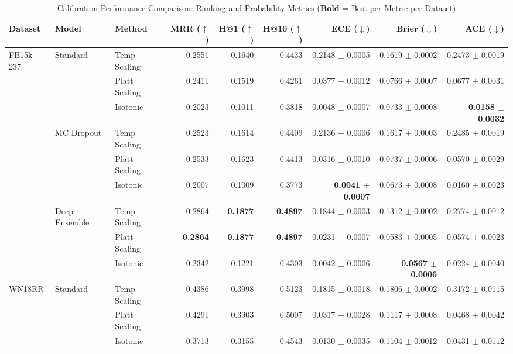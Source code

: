 \begin{table}[t]
\centering
\small
\caption{Calibration Performance Comparison: Ranking and Probability Metrics (\textbf{Bold} = Best per Metric per Dataset)}
\label{tab:calibration_comparison}
\begin{tabular}{ll l rrrrrr}
\toprule
\textbf{Dataset} & \textbf{Model} & \textbf{Method} & MRR ($\uparrow$) & H@1 ($\uparrow$) & H@10 ($\uparrow$) & ECE ($\downarrow$) & Brier ($\downarrow$) & ACE ($\downarrow$) \\
\midrule
\multirow{9}{*}{FB15k-237} & \multirow{3}{*}{Standard} & Temp Scaling & 0.2551 & 0.1640 & 0.4433 & 0.2148 $\pm$ 0.0005 & 0.1619 $\pm$ 0.0002 & 0.2473 $\pm$ 0.0019 \\
 &  & Platt Scaling & 0.2411 & 0.1519 & 0.4261 & 0.0377 $\pm$ 0.0012 & 0.0766 $\pm$ 0.0007 & 0.0677 $\pm$ 0.0031 \\
 &  & Isotonic & 0.2023 & 0.1011 & 0.3818 & 0.0048 $\pm$ 0.0007 & 0.0733 $\pm$ 0.0008 & \textbf{0.0158 $\pm$ 0.0032} \\
\cmidrule(lr){2-9}
 & \multirow{3}{*}{MC Dropout} & Temp Scaling & 0.2523 & 0.1614 & 0.4409 & 0.2136 $\pm$ 0.0006 & 0.1617 $\pm$ 0.0003 & 0.2485 $\pm$ 0.0019 \\
 &  & Platt Scaling & 0.2533 & 0.1623 & 0.4413 & 0.0316 $\pm$ 0.0010 & 0.0737 $\pm$ 0.0006 & 0.0570 $\pm$ 0.0029 \\
 &  & Isotonic & 0.2007 & 0.1009 & 0.3773 & \textbf{0.0041 $\pm$ 0.0007} & 0.0673 $\pm$ 0.0008 & 0.0160 $\pm$ 0.0023 \\
\cmidrule(lr){2-9}
 & \multirow{3}{*}{Deep Ensemble} & Temp Scaling & 0.2864 & \textbf{0.1877} & \textbf{0.4897} & 0.1844 $\pm$ 0.0003 & 0.1312 $\pm$ 0.0002 & 0.2774 $\pm$ 0.0012 \\
 &  & Platt Scaling & \textbf{0.2864} & \textbf{0.1877} & \textbf{0.4897} & 0.0231 $\pm$ 0.0007 & 0.0583 $\pm$ 0.0005 & 0.0574 $\pm$ 0.0023 \\
 &  & Isotonic & 0.2342 & 0.1221 & 0.4303 & 0.0042 $\pm$ 0.0006 & \textbf{0.0567 $\pm$ 0.0006} & 0.0224 $\pm$ 0.0040 \\
\cmidrule(lr){2-9}
\midrule
\multirow{9}{*}{WN18RR} & \multirow{3}{*}{Standard} & Temp Scaling & 0.4386 & 0.3998 & 0.5123 & 0.1815 $\pm$ 0.0018 & 0.1806 $\pm$ 0.0002 & 0.3172 $\pm$ 0.0115 \\
 &  & Platt Scaling & 0.4291 & 0.3903 & 0.5007 & 0.0317 $\pm$ 0.0028 & 0.1117 $\pm$ 0.0008 & 0.0468 $\pm$ 0.0042 \\
 &  & Isotonic & 0.3713 & 0.3155 & 0.4543 & 0.0130 $\pm$ 0.0035 & 0.1104 $\pm$ 0.0012 & 0.0431 $\pm$ 0.0112 \\

\end{tabular}
\end{table}
